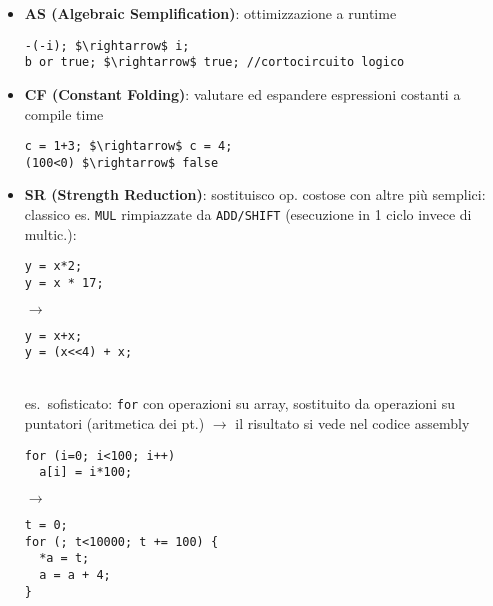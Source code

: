 \begin{itemize}
  \item \textbf{AS (Algebraic Semplification)}: ottimizzazione a runtime
    \begin{lstlisting}
-(-i); $\rightarrow$ i;
b or true; $\rightarrow$ true; //cortocircuito logico\end{lstlisting}
  \item \textbf{CF (Constant Folding)}:  valutare ed espandere espressioni costanti a compile time
    \begin{lstlisting}
c = 1+3; $\rightarrow$ c = 4;
(100<0) $\rightarrow$ false\end{lstlisting}

\item \textbf{SR (Strength Reduction)}: sostituisco op. costose con altre pi\`u semplici: classico es. \lstinline|MUL| rimpiazzate da \lstinline|ADD/SHIFT| (esecuzione in 1 ciclo invece di multic.):\vspace{.5em}\\
    \begin{minipage}[c]{.4\textwidth}
      \begin{lstlisting}
y = x*2;
y = x * 17;\end{lstlisting}
    \end{minipage}
    \hfill
    $\rightarrow$
    \hfill
    \begin{minipage}[c]{.4\textwidth}
      \begin{lstlisting}
y = x+x;
y = (x<<4) + x;\end{lstlisting}
    \end{minipage}\\
    es.~sofisticato: \lstinline|for| con operazioni su array, sostituito da operazioni su puntatori (aritmetica dei pt.) $\rightarrow$ il risultato si vede nel codice assembly\\
    \begin{minipage}[c]{.4\textwidth}
      \begin{lstlisting}
for (i=0; i<100; i++)
  a[i] = i*100;\end{lstlisting} 
      \end{minipage}
      \hfill
      $\rightarrow$
      \hfill
      \begin{minipage}[c]{.4\textwidth}
        \begin{lstlisting}
t = 0;
for (; t<10000; t += 100) {
  *a = t;
  a = a + 4;
}\end{lstlisting}
    \end{minipage}


\end{itemize}
